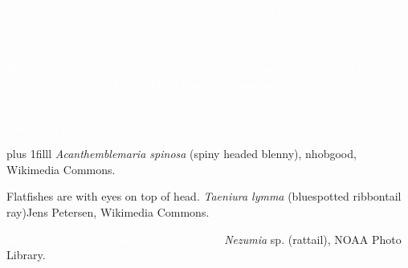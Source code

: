 \documentclass[t]{beamer}
\begin{document}
{
\begin{frame}[b,plain]{\textcolor{white}{Bottom-rovers are ventrally flattened with terminal to inferior mouths.}}
\hfill\tiny\textcolor{white}{\textit{File:Upeneichthys lineatus} (blue-lined goatfish, Ian Skipworth, Wikimedia Commons.}
\end{frame}
}

{
\begin{frame}[b,plain]{\textcolor{white}{Bottom clingers are small with fused pelvic fins.}}
\hfill\tiny\textcolor{white}{\textit{Cryptocentrus cinctus} (yellow prawn-goby), Nicolas Keller, Flickr Creative Commons.}
\end{frame}
}

{
\begin{frame}[t,plain]{}

\hangpara\Large\textcolor{white}{Bottom hiders are small \\
and live in crevices.}

\vskip0pt plus 1filll
\tiny\textcolor{white!80!black}{\textit{Acanthemblemaria spinosa} (spiny headed blenny), nhobgood, Wikimedia Commons.}
\end{frame}
}

{
\begin{frame}[b,plain]{Flatfishes are  with eyes on top of head.}
\tiny\textit{Taeniura lymma} (bluespotted ribbontail ray)\hfill Jens Petersen, Wikimedia Commons.
\end{frame}
}


{
\begin{frame}[b,plain]{\textcolor{white}{Rattails have large heads and tapered tails.}}
\tiny\textcolor{white!80!black}{\textit{Nezumia} sp. (rattail), NOAA Photo Library.}
\end{frame}
}
\end{document}
